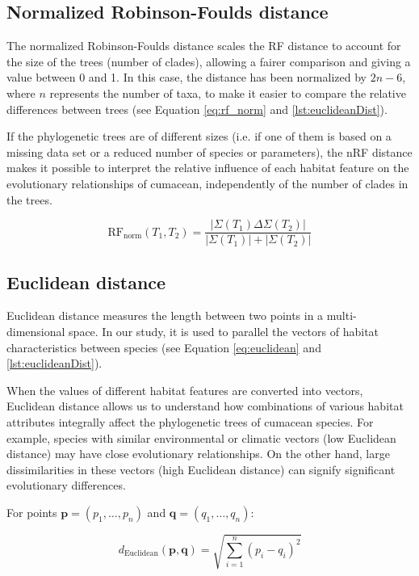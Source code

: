 \subsection{Normalized Robinson-Foulds distance}\label{RFnorm}

The normalized Robinson-Foulds distance scales the RF distance to account for the size  of the trees (number of clades), allowing a fairer comparison and giving a value between 0 and 1. In this case, the distance has been normalized by $2n-6$, where $n$ represents the number of taxa, to make it easier to compare the relative differences between trees (see Equation \eqref{eq:rf_norm} and \autoref{lst:euclideanDist}).

If the phylogenetic trees are of different sizes (i.e. if one of them is based on a missing data set or a reduced number of species or parameters), the nRF distance makes it possible to interpret the relative influence of each habitat feature on the evolutionary relationships of cumacean, independently of the number of clades in the trees.

\begin{equation}\label{eq:rf_norm}
    \text{RF}_{\text{norm}}(T_1, T_2) = \frac{| \Sigma(T_1) \Delta \Sigma(T_2) |}{| \Sigma(T_1) | + | \Sigma(T_2) |}
\end{equation}

\subsection{Euclidean distance}\label{euclidean}

Euclidean distance measures the length between two points in a multi-dimensional space. In our study, it is used to parallel the vectors of habitat characteristics between species (see Equation \eqref{eq:euclidean} and \autoref{lst:euclideanDist}).

When the values of different habitat features are converted into vectors, Euclidean distance allows us to understand how combinations of various habitat attributes integrally affect the phylogenetic trees of cumacean species. For example, species with similar environmental or climatic vectors (low Euclidean distance) may have close evolutionary relationships. On the other hand, large dissimilarities in these vectors (high Euclidean distance) can signify significant evolutionary differences.

For points $\mathbf{p} = (p_1, \ldots, p_n)$ and $\mathbf{q} = (q_1, \ldots, q_n)$:

\begin{equation}\label{eq:euclidean}
    d_{\text{Euclidean}}(\mathbf{p}, \mathbf{q}) = \sqrt{\sum_{i=1}^{n} (p_i - q_i)^2}
\end{equation}

